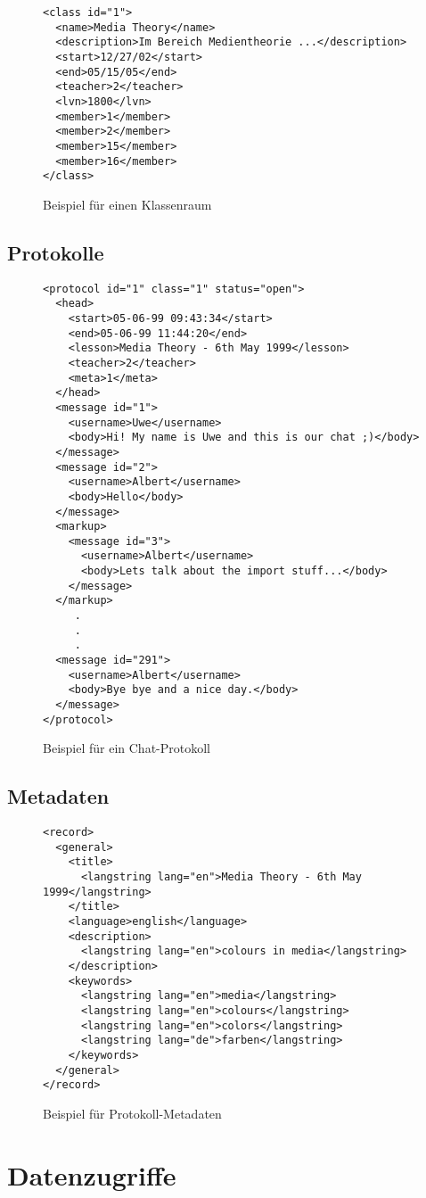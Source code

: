 \begin{figure}[h]
\begin{verbatim}
<class id="1">
  <name>Media Theory</name>
  <description>Im Bereich Medientheorie ...</description>
  <start>12/27/02</start>
  <end>05/15/05</end>
  <teacher>2</teacher>
  <lvn>1800</lvn>
  <member>1</member>
  <member>2</member>
  <member>15</member>
  <member>16</member>
</class>
\end{verbatim}
\caption{Beispiel f\"ur einen Klassenraum}
\end{figure}


\subsection{Protokolle}

\begin{figure}[h]
\begin{verbatim}
<protocol id="1" class="1" status="open">
  <head>
    <start>05-06-99 09:43:34</start>
    <end>05-06-99 11:44:20</end>
    <lesson>Media Theory - 6th May 1999</lesson>
    <teacher>2</teacher>
    <meta>1</meta>
  </head>
  <message id="1">
    <username>Uwe</username>
    <body>Hi! My name is Uwe and this is our chat ;)</body>
  </message>
  <message id="2">
    <username>Albert</username>
    <body>Hello</body>
  </message>
  <markup>
    <message id="3">
      <username>Albert</username>
      <body>Lets talk about the import stuff...</body>
    </message>
  </markup>
     .
     .
     .
  <message id="291">
    <username>Albert</username>
    <body>Bye bye and a nice day.</body>
  </message>
</protocol>
\end{verbatim}
\caption{Beispiel f\"ur ein Chat-Protokoll}
\end{figure}

\subsection{Metadaten}




\begin{figure}[h]
\begin{verbatim}
<record>
  <general>
    <title>
      <langstring lang="en">Media Theory - 6th May 1999</langstring>
    </title>
    <language>english</language>
    <description>
      <langstring lang="en">colours in media</langstring>
    </description>
    <keywords>
      <langstring lang="en">media</langstring>
      <langstring lang="en">colours</langstring>
      <langstring lang="en">colors</langstring>
      <langstring lang="de">farben</langstring>
    </keywords>
  </general>
</record>
\end{verbatim}
\caption{Beispiel f\"ur Protokoll-Metadaten}
\end{figure}
\section{Datenzugriffe}




